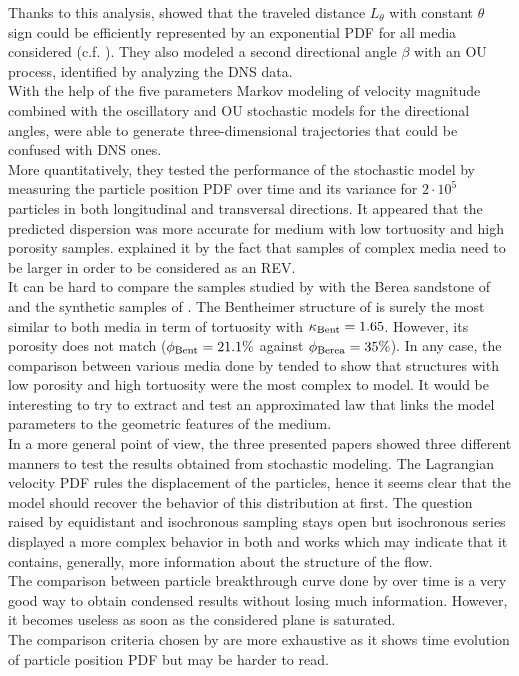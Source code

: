 Thanks to this analysis, \citeauthor{Meyer2016} showed that the traveled distance $L_\theta$ with constant $\theta$ sign could be efficiently represented by an exponential PDF for all media considered (c.f. \citet[Fig- 12]{Meyer2016}). They also modeled a second directional angle $\beta$ with an OU process, identified by analyzing the DNS data.\\
With the help of the five parameters Markov modeling of velocity magnitude combined with the oscillatory and OU stochastic models for the directional angles, \citet{Meyer2016} were able to generate three-dimensional trajectories that could be confused with DNS ones. \\
More quantitatively, they tested the performance of the stochastic model by measuring the particle position PDF over time and its variance for $2\cdot10^5$ particles in both longitudinal and transversal directions.
It appeared that the predicted dispersion was more accurate for medium with low tortuosity and high porosity samples. 
\cite{Meyer2016} explained it by the fact that samples of complex media need to be larger in order to be considered as an REV.\\

It can be hard to compare the samples studied by \citeauthor{Meyer2016} with the Berea sandstone of \citet{Dentz2017} and the synthetic samples of \citet{Puyguiraud2019}. 
The Bentheimer structure of \citet{Meyer2016} is surely the most similar to both media in term of tortuosity with $\kappa_{\rm{Bent}}=1.65$. 
However, its porosity does not match ($\phi_{\rm{Bent}}=21.1\%$ against $\phi_{\rm{Berea}}=35\%$).
In any case, the comparison between various media done by \citet{Meyer2016} tended to show that structures with low porosity and high tortuosity were the most complex to model. 
It would be interesting to try to extract and test an approximated law that links the model parameters to the geometric features of the medium.\\

In a more general point of view, the three presented papers showed three different manners to test the results obtained from stochastic modeling. 
The Lagrangian velocity PDF rules the displacement of the particles, hence it seems clear that the model should recover the behavior of this distribution at first.
The question raised by equidistant and isochronous sampling stays open but isochronous series displayed a more complex behavior in both \citet{Meyer2016} and \citet{Puyguiraud2019} works which may indicate that it contains, generally, more information about the structure of the flow.\\
The comparison between particle breakthrough curve done by \citet{Dentz2017} over time is a very good way to obtain condensed results without losing much information. However, it becomes useless as soon as the considered plane is saturated.\\
The comparison criteria chosen by \citet{Meyer2016} are more exhaustive as it shows time evolution of particle position PDF but may be harder to read.\\

